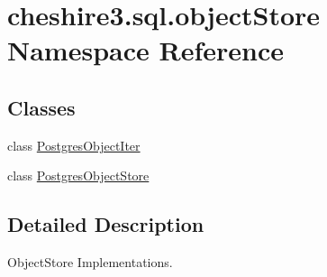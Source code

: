 \hypertarget{namespacecheshire3_1_1sql_1_1object_store}{\section{cheshire3.\-sql.\-object\-Store Namespace Reference}
\label{namespacecheshire3_1_1sql_1_1object_store}
}
\subsection*{Classes}
\begin{DoxyCompactItemize}
\item 
class \hyperlink{classcheshire3_1_1sql_1_1object_store_1_1_postgres_object_iter}{Postgres\-Object\-Iter}
\item 
class \hyperlink{classcheshire3_1_1sql_1_1object_store_1_1_postgres_object_store}{Postgres\-Object\-Store}
\end{DoxyCompactItemize}


\subsection{Detailed Description}
\begin{DoxyVerb}ObjectStore Implementations.\end{DoxyVerb}
 